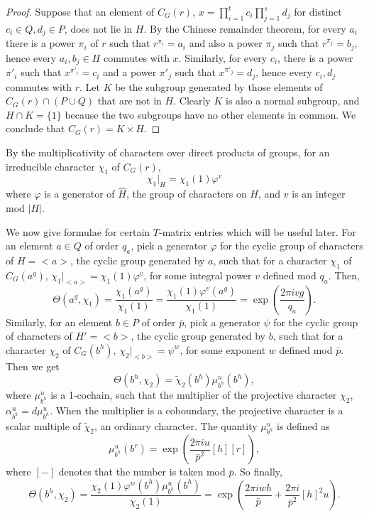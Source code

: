 \documentclass[a4paper, 10pt]{book}
\theoremstyle{definition}
\numberwithin{equation}{chapter}
\newcommand{\pb}{\bar{p}}
\newcommand{\qb}{q_a}
\begin{document}
\begin{proof}
Suppose that  an  element of $C_G(r)$, $x=\prod_{i=1}^{t}c_i\prod_{j=1}^{s}d_j$ for distinct $c_i\in Q, d_j\in P$, does not lie in $H$.  By the Chinese remainder theorem,  for every $a_i$ there is a power $\pi_i$ of $r$ such that $r^{\pi_i} = a_i$ and also a power $\pi_j$ such that $r^{\pi_j} = b_j$, hence every $a_i, b_j\in H$ commutes with $x$. Similarly, for every $c_i$, there is a power $\pi'_i$ such that $x^{\pi'_i}= c_i$ and a power $\pi'_j$ such that $x^{\pi'_j} = d_j $,  hence every $c_i, d_j$ commutes with $r$. Let $K$ be the subgroup generated by those elements of $C_G(r) \cap(P\cup Q)$ that are not in $H$. Clearly $K$ is also a normal subgroup, and $H\cap K =\{1\}$ because the two subgroups have no other elements in common.  We conclude that $C_G(r)= K\times H$.
\end{proof}
By the multiplicativity of characters over direct products of groups, for an irreducible character $\chi_1$ of $C_G(r)$, \begin{equation*}
	\chi_1|_{H} = \chi_1(1)\varphi^v
\end{equation*} where $\varphi$ is a generator of $\hat{H}$, the group of characters on $H$, and $v$ is an integer mod $|H|$.


We now give formulae for certain $T$-matrix entries which will be useful later. For an element $a\in Q$ of order $\qb$, pick a generator $\varphi$ for the cyclic group of characters of $H=<a>$, the cyclic group generated by $a$, such that for a character $\chi_1$ of $C_G(a^g)$, $\chi_1|_{<a>} = \chi_1(1)\varphi^v$, for  some integral power $v$ defined mod $\qb$. Then,
 \begin{equation}\label{a}
	  \Theta(a^{g}, \chi_1) = \frac{\chi_1(a^{g})}{\chi_1(1)}
	= \frac{\chi_1(1)\varphi^v(a^{g})}{\chi_1(1)} 
	= \exp(\frac{2\pi iv g}{\qb}).
	\end{equation}
 Similarly, for an element $b\in P$ of order $\pb$, pick a generator $\psi$ for the cyclic group of characters of $H'=<b>$, the cyclic group generated by $b$, such that for a character $\chi_2$ of $C_G(b^h)$, $\chi_2|_{<b>} = \psi^w$, for some exponent $w$ defined mod $\pb$. Then we get
 \begin{equation*}
	 \Theta(b^{h}, \chi_2) = \tilde{\chi}_2(b^{h})\mu^u_{b^h}(b^h),
	 \end{equation*}
where $\mu^u_{b^h}$ is a 1-cochain, such that the multiplier of the projective character $\chi_2$, $\alpha_{b^k}^u = d\mu^u_{b^h}$. When the multiplier is a coboundary, the projective character is a scalar multiple of $\tilde{\chi}_2$, an ordinary character.  The quantity $\mu^u_{b^h}$ is defined as \begin{equation*}
	\mu_{b^h}^u (b^r) = \exp(\frac{2\pi iu}{\pb^2}[h][r]),
\end{equation*}
where $[-]$ denotes that the number is taken mod $\pb$. So finally,
\begin{equation*}
	 \Theta(b^{h}, \chi_2)	 = \frac{\chi_2(1)\varphi^w (b^{h})\mu^u_{b^h}(b^h)}{\chi_2(1)} 
	 =\exp (\frac{2\pi iwh}{\pb} + \frac{2\pi i}{\pb^2}[h]^2u).
\end{equation*}
\end{document}
